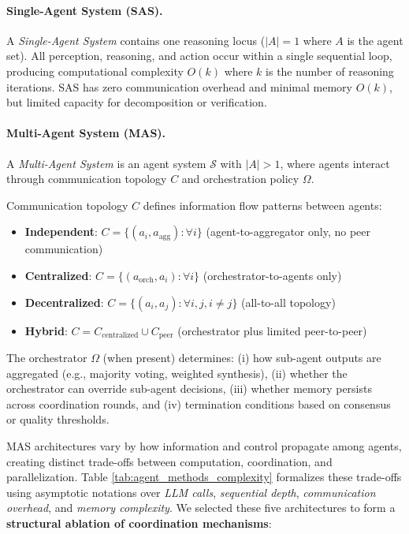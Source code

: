 \vspace{0.4em}
\paragraph{Single-Agent System (SAS).}
A \emph{Single-Agent System} contains one reasoning locus ($|A|=1$ where $A$ is the agent set). All perception, reasoning, and action occur within a single sequential loop, producing computational complexity $O(k)$ where $k$ is the number of reasoning iterations. SAS has zero communication overhead and minimal memory $O(k)$, but limited capacity for decomposition or verification.

\vspace{0.4em}
\paragraph{Multi-Agent System (MAS).}

A \emph{Multi-Agent System} is an agent system $\mathcal{S}$ with $|A| > 1$, where agents interact through communication topology $C$ and orchestration policy $\Omega$.

Communication topology $C$ defines information flow patterns between agents:
\begin{itemize}
    \item \textbf{Independent}: $C = \{(a_i, a_{\text{agg}}) : \forall i\}$ (agent-to-aggregator only, no peer communication)
    \item \textbf{Centralized}: $C = \{(a_{\text{orch}}, a_i) : \forall i\}$ (orchestrator-to-agents only)  
    \item \textbf{Decentralized}: $C = \{(a_i, a_j) : \forall i,j, i \neq j\}$ (all-to-all topology)
    \item \textbf{Hybrid}: $C = C_{\text{centralized}} \cup C_{\text{peer}}$ (orchestrator plus limited peer-to-peer)
\end{itemize}

The orchestrator $\Omega$ (when present) determines: (i) how sub-agent outputs are aggregated (e.g., majority voting, weighted synthesis), (ii) whether the orchestrator can override sub-agent decisions, (iii) whether memory persists across coordination rounds, and (iv) termination conditions based on consensus or quality thresholds.

MAS architectures vary by how information and control propagate among agents, creating distinct trade-offs between computation, coordination, and parallelization. Table \ref{tab:agent_methods_complexity} formalizes these trade-offs using asymptotic notations over \textit{LLM calls}, \textit{sequential depth}, \textit{communication overhead}, and \textit{memory complexity}. We selected these five architectures to form a \textbf{structural ablation of coordination mechanisms}:

